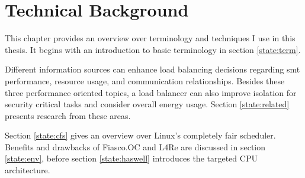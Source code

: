\chapter{Technical Background}
\label{sec:state}







This chapter provides an overview over terminology and techniques I use in this
thesis. It begins with an introduction to basic terminology in section
\ref{state:term}.

Different information sources can enhance load balancing decisions regarding
\gls{smt} performance, resource usage, and communication relationships.
Besides these three performance oriented topics, a load balancer can also
improve isolation for security critical tasks and consider overall energy
usage.
Section \ref{state:related} presents research from these areas.

Section \ref{state:cfs} gives an overview over Linux's completely fair
scheduler.
Benefits and drawbacks of Fiasco.OC and L4Re are discussed in section
\ref{state:env}, before section \ref{state:haswell} introduces the targeted
CPU architecture.













\cleardoublepage

